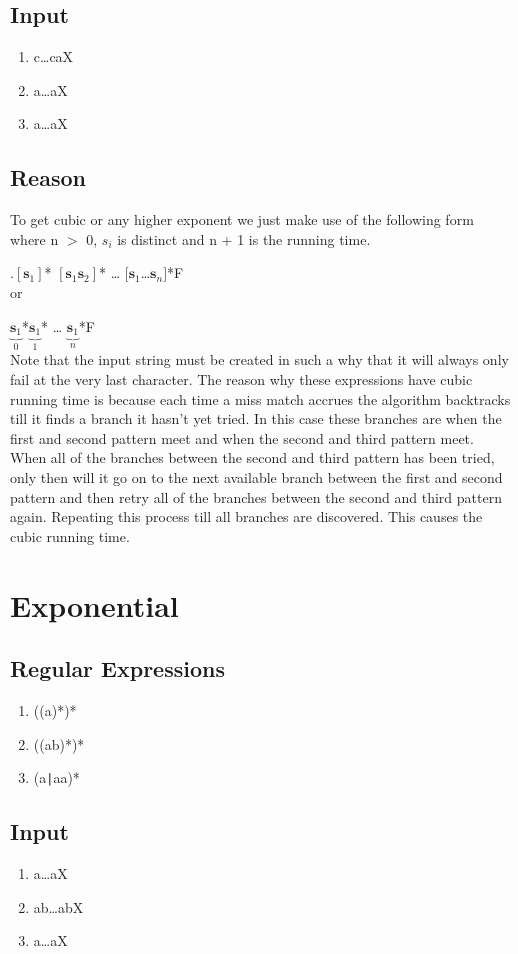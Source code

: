 \documentclass[a4paper, 1pt]{article}
\newcommand{\plus}{\raisebox{.4ex}{\small{+}}}
\begin{document}
\subsection{Input}
\begin{enumerate}
\item c\dots caX
\item a\dots aX
\item a\dots aX
\end{enumerate}
\subsection{Reason}
To get cubic or any higher exponent we just make use of the following form where n $>$ 0, $s_{i}$ is distinct and n + 1 is the running time. 

.\plus$[\textbf{s}_{1}]$*
$[\textbf{s}_{1}\textbf{s}_{2}]$*
\dots 
$[\textbf{s}_{1}$\dots $\textbf{s}_{n}]$*F
\\
or

$\underbrace{\textbf{s}_{1}}_{0}$*$\underbrace{\textbf{s}_{1}}_{1}$*
\dots 
$\underbrace{\textbf{s}_{1}}_{n}$*F\\
Note that the input string must be created in such a why that it will always only fail at the very last character. The reason why these expressions have cubic running time is because each time a miss match 
accrues the algorithm backtracks till it finds a branch it hasn't yet tried. In this case these branches are when the first and second pattern meet and when the second and third pattern meet. When all of the branches between the second and third pattern has been tried, only then will it go on to the next available branch between the first and second pattern and then retry all of the branches between the second and third pattern again. Repeating this process till all branches are discovered.  This causes the cubic running time.
\section{Exponential}
\subsection{Regular Expressions}
\begin{enumerate}
\item ((a)*)*
\item ((ab)*)*
\item (a\verb#|#aa)*
\end{enumerate}
\subsection{Input}
\begin{enumerate}
\item a\dots aX
\item ab\dots abX
\item a\dots aX
\end{enumerate}
\end{document}
